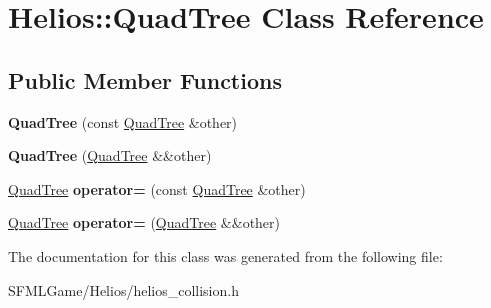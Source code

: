 \hypertarget{class_helios_1_1_quad_tree}{}\section{Helios\+:\+:Quad\+Tree Class Reference}
\label{class_helios_1_1_quad_tree}
\subsection*{Public Member Functions}
\begin{DoxyCompactItemize}
\item 
\hypertarget{class_helios_1_1_quad_tree_afe790179e3b622d2b2bbb2d431c167bc}{}{\bfseries Quad\+Tree} (const \hyperlink{class_helios_1_1_quad_tree}{Quad\+Tree} \&other)\label{class_helios_1_1_quad_tree_afe790179e3b622d2b2bbb2d431c167bc}

\item 
\hypertarget{class_helios_1_1_quad_tree_a9a40d641d5011e667259fae1ba833d67}{}{\bfseries Quad\+Tree} (\hyperlink{class_helios_1_1_quad_tree}{Quad\+Tree} \&\&other)\label{class_helios_1_1_quad_tree_a9a40d641d5011e667259fae1ba833d67}

\item 
\hypertarget{class_helios_1_1_quad_tree_a01fe5a42db3aa7194e49a2b97fdd5cc2}{}\hyperlink{class_helios_1_1_quad_tree}{Quad\+Tree} {\bfseries operator=} (const \hyperlink{class_helios_1_1_quad_tree}{Quad\+Tree} \&other)\label{class_helios_1_1_quad_tree_a01fe5a42db3aa7194e49a2b97fdd5cc2}

\item 
\hypertarget{class_helios_1_1_quad_tree_a393f1b3d1b351f541593a667d5ba74cb}{}\hyperlink{class_helios_1_1_quad_tree}{Quad\+Tree} {\bfseries operator=} (\hyperlink{class_helios_1_1_quad_tree}{Quad\+Tree} \&\&other)\label{class_helios_1_1_quad_tree_a393f1b3d1b351f541593a667d5ba74cb}

\end{DoxyCompactItemize}


The documentation for this class was generated from the following file\+:\begin{DoxyCompactItemize}
\item 
S\+F\+M\+L\+Game/\+Helios/helios\+\_\+collision.\+h\end{DoxyCompactItemize}
